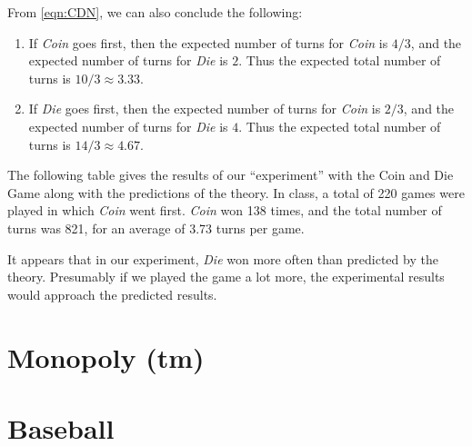 \documentclass[reqno]{immbook}
\begin{document}
From \eqref{eqn:CDN}, we can also conclude the following:
\begin{enumerate}
\item If \emph{Coin} goes first, then the expected number of
turns for \emph{Coin} is $4/3$, and the expected number of
turns for \emph{Die} is $2$.  Thus the expected total number
of turns is $10/3\approx 3.33$.
\item If \emph{Die} goes first, then the expected number of
turns for \emph{Coin} is $2/3$, and the expected number of
turns for \emph{Die} is $4$.  Thus the expected total number
of turns is $14/3\approx 4.67$.
\end{enumerate}

The following table gives the results of our
``experiment'' with the Coin and Die Game along with
the predictions of the theory.
In class, a total of 220 games were played in which
\emph{Coin} went first.
\emph{Coin} won 138 times, and the total number of
turns was 821, for an average of 3.73 turns per game.

\medskip
\centerline{
}

\medskip
It appears that in our experiment, \emph{Die} won more
often than predicted by the theory.
Presumably if we played the game a lot more, the
experimental results would approach the predicted results.


\section{Monopoly (tm)}
\section{Baseball}
\end{document}
